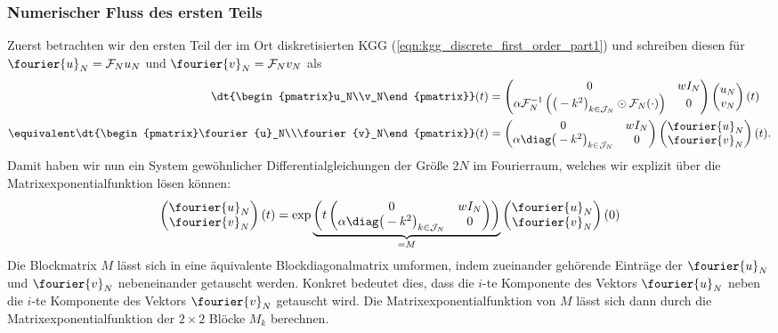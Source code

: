 \subsubsection*{Numerischer Fluss des ersten Teils}
Zuerst betrachten wir den ersten Teil der im Ort diskretisierten KGG (\ref{eqn:kgg_discrete_first_order_part1}) und schreiben diesen für $\fourier{u}_N=\mathcal{F}_Nu_N$ und $\fourier{v}_N=\mathcal{F}_Nv_N$ als
\begin{align*}
\dt{\begin{pmatrix}u_N\\v_N\end{pmatrix}}(t)&=
\begin{pmatrix}0 & wI_N\\ \alpha\mathcal{F}_N^{-1}\left(\big(-k^2\big)_{k\in\mathcal{J}_N}\odot\mathcal{F}_N (\cdot )\right) & 0\end{pmatrix}
\begin{pmatrix}u_N\\v_N\end{pmatrix}(t)\\
\equivalent 
\dt{\begin{pmatrix}\fourier{u}_N\\\fourier{v}_N\end{pmatrix}}(t)&=
\begin{pmatrix}0 & wI_N\\ \alpha\diag\big(-k^2\big)_{k\in\mathcal{J}_N} & 0\end{pmatrix}
\begin{pmatrix}\fourier{u}_N\\\fourier{v}_N\end{pmatrix}(t).
\end{align*}
Damit haben wir nun ein System gewöhnlicher Differentialgleichungen der Größe $2N$ im Fourierraum, welches wir explizit über die Matrixexponentialfunktion lösen können:
\[\begin{pmatrix}\fourier{u}_N\\\fourier{v}_N\end{pmatrix}(t)=\exp\underbrace{\left(t\begin{pmatrix}0 & wI_N\\ \alpha\diag\big(-k^2\big)_{k\in\mathcal{J}_N} & 0\end{pmatrix}\right)}_{=M}
\begin{pmatrix}\fourier{u}_N\\\fourier{v}_N\end{pmatrix}(0)\]
Die Blockmatrix $M$ lässt sich in eine äquivalente Blockdiagonalmatrix umformen, indem zueinander gehörende Einträge der $\fourier{u}_N$ und $\fourier{v}_N$ nebeneinander getauscht werden. Konkret bedeutet dies, dass die $i$-te Komponente des Vektors $\fourier{u}_N$ neben die $i$-te Komponente des Vektors $\fourier{v}_N$ getauscht wird. Die Matrixexponentialfunktion von $M$ lässt sich dann durch die Matrixexponentialfunktion der $2\times 2$ Blöcke $M_k$ berechnen. 
